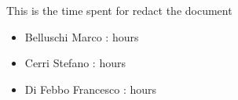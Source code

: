 This is the time spent for redact the document
\begin{itemize}
	\item Belluschi Marco :  hours
	\item Cerri Stefano :  hours
	\item Di Febbo Francesco :  hours
\end{itemize}